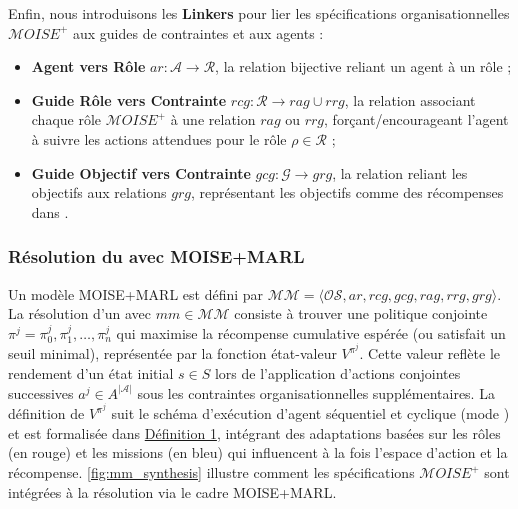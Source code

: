 \noindent Enfin, nous introduisons les \textbf{Linkers} pour lier les spécifications organisationnelles $\mathcal{M}OISE^+$ aux guides de contraintes et aux agents :
%
\begin{itemize}

  \item \textbf{Agent vers Rôle} \quad $ar: \mathcal{A} \to \mathcal{R}$, la relation bijective reliant un agent à un rôle ;
  \item \textbf{Guide Rôle vers Contrainte} \quad $rcg: \mathcal{R} \rightarrow rag \cup rrg$, la relation associant chaque rôle $\mathcal{M}OISE^+$ à une relation $rag$ ou $rrg$, forçant/encourageant l'agent à suivre les actions attendues pour le rôle $\rho \in \mathcal{R}$ ;
  \item \textbf{Guide Objectif vers Contrainte} \quad $gcg: \mathcal{G} \rightarrow grg$, la relation reliant les objectifs aux relations $grg$, représentant les objectifs comme des récompenses dans .
\end{itemize}

\subsubsection*{Résolution du  avec MOISE+MARL}

Un modèle MOISE+MARL est défini par $\mathcal{MM} = \langle \mathcal{OS}, ar, rcg, gcg, rag, rrg, grg \rangle$.
La résolution d'un  avec $mm \in \mathcal{MM}$ consiste à trouver une politique conjointe $\pi^j = {\pi^j_0, \pi^j_1, \dots, \pi^j_n}$ qui maximise la récompense cumulative espérée (ou satisfait un seuil minimal), représentée par la fonction état-valeur $V^{\pi^j}$. Cette valeur reflète le rendement d'un état initial $s \in S$ lors de l'application d'actions conjointes successives $a^j \in A^{|\mathcal{A}|}$ sous les contraintes organisationnelles supplémentaires.
%
La définition de $V^{\pi^j}$ suit le schéma d'exécution d'agent séquentiel et cyclique (mode ) et est formalisée dans \hyperref[eq:single_value_function]{Définition 1}, intégrant des adaptations basées sur les rôles (en rouge) et les missions (en bleu) qui influencent à la fois l'espace d'action et la récompense.
\autoref{fig:mm_synthesis} illustre comment les spécifications $\mathcal{M}OISE^+$ sont intégrées à la résolution  via le cadre MOISE+MARL.


